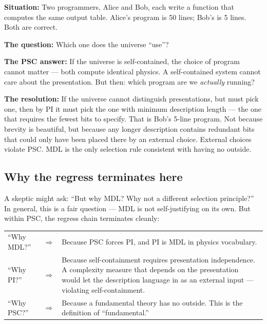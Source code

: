 \documentclass[11pt,a4paper]{article}
\begin{document}
\begin{tcolorbox}[colback=boxorange,colframe=orange!60!black,
  title=PI \texorpdfstring{$\equiv$}{=} MDL: worked analogy,breakable]
\textbf{Situation:} Two programmers, Alice and Bob, each write a function that
computes the same output table.  Alice's program is 50 lines; Bob's is 5 lines.
Both are correct.

\textbf{The question:} Which one does the universe ``use''?

\textbf{The PSC answer:} If the universe is self-contained, the choice of program
cannot matter — both compute identical physics.  A self-contained system cannot care
about the presentation.  But then: which program are we \emph{actually} running?

\textbf{The resolution:} If the universe cannot distinguish presentations, but must
pick one, then by PI it must pick the one with minimum description length — the one
that requires the fewest bits to specify.  That is Bob's 5-line program.  Not because
brevity is beautiful, but because any longer description contains redundant bits that
could only have been placed there by an external choice.  External choices violate PSC.
MDL is the only selection rule consistent with having no outside.
\end{tcolorbox}

\subsection{Why the regress terminates here}

A skeptic might ask: ``But why MDL?  Why not a different selection principle?''
In general, this is a fair question — MDL is not self-justifying on its own.
But within PSC, the regress chain terminates cleanly:

\bigskip
\begin{center}
\renewcommand{\arraystretch}{1.6}
\begin{tabular}{@{}p{2.5cm}p{0.3cm}p{9cm}@{}}
``Why MDL?'' & $\Rightarrow$ & Because PSC forces PI, and PI is MDL in physics vocabulary. \\
``Why PI?'' & $\Rightarrow$ & Because self-containment requires presentation independence.
  A complexity measure that depends on the presentation would let the description
  language in as an external input — violating self-containment. \\
``Why PSC?'' & $\Rightarrow$ & Because a fundamental theory has no outside.
  This is the definition of ``fundamental.'' \\
\end{tabular}
\end{center}
\end{document}
